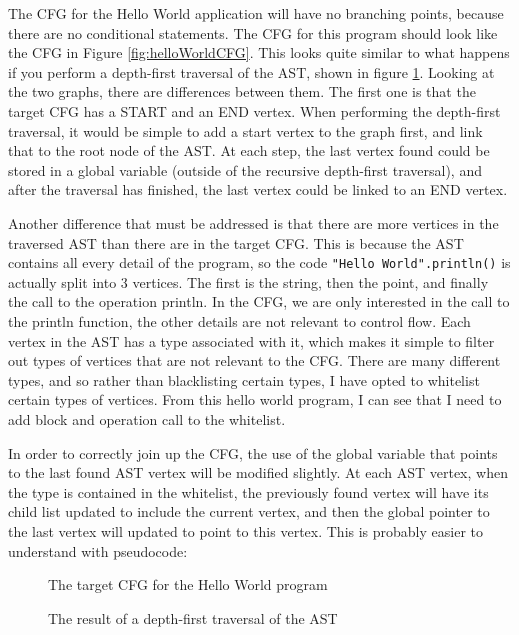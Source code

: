 The CFG for the Hello World application will have no branching points, because there are no conditional statements. The CFG for this program should look like the CFG in Figure \ref{fig:helloWorldCFG}. This looks quite similar to what happens if you perform a depth-first traversal of the AST, shown in figure \ref{fig:helloWorldDF}. Looking at the two graphs, there are differences between them. The first one is that the target CFG has a START and an END vertex. When performing the depth-first traversal, it would be simple to add a start vertex to the graph first, and link that to the root node of the AST. At each step, the last vertex found could be stored in a global variable (outside of the recursive depth-first traversal), and after the traversal has finished, the last vertex could be linked to an END vertex.

Another difference that must be addressed is that there are more vertices in the traversed AST than there are in the target CFG. This is because the AST contains all every detail of the program, so the code \verb|"Hello World".println()| is actually split into 3 vertices. The first is the string, then the point, and finally the call to the operation println. In the CFG, we are only interested in the call to the println function, the other details are not relevant to control flow. Each vertex in the AST has a type associated with it, which makes it simple to filter out types of vertices that are not relevant to the CFG. There are many different types, and so rather than blacklisting certain types, I have opted to whitelist certain types of vertices. From this hello world program, I can see that I need to add block and operation call to the whitelist.

In order to correctly join up the CFG, the use of the global variable that points to the last found AST vertex will be modified slightly. At each AST vertex, when the type is contained in the whitelist, the previously found vertex will have its child list updated to include the current vertex, and then the global pointer to the last vertex will updated to point to this vertex. This is probably easier to understand with pseudocode:



\begin{figure}
\centering
\begin{minipage}{.4\textwidth}
  \centering
    \caption{The target CFG for the Hello World program}
    \label{fig:helloWorldCFG}
\end{minipage}%
\begin{minipage}{.15\textwidth}
\hspace{1cm}
\end{minipage}
\begin{minipage}{.4\textwidth}
  \centering
  \caption{The result of a depth-first traversal of the AST}
  \label{fig:helloWorldDF}
\end{minipage}
\end{figure}

